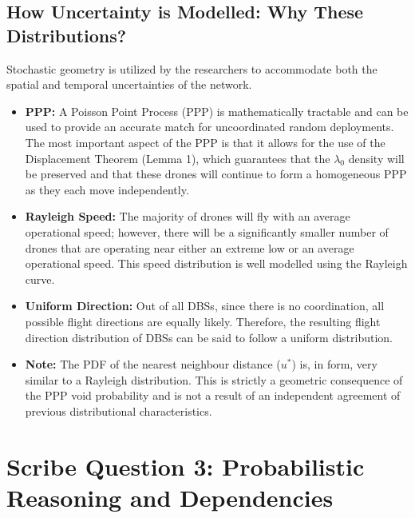 \documentclass[12pt,a4paper]{article}
\begin{document}
   \subsection*{How Uncertainty is Modelled: Why These Distributions?} %
Stochastic geometry is utilized by the researchers to accommodate both the spatial and temporal uncertainties of the network.    %
\begin{itemize}
    \item \textbf{PPP:} A Poisson Point Process (PPP) is mathematically tractable and can be used to provide an accurate match for uncoordinated random deployments.    %
    The most important aspect of the PPP is that it allows for the use of the Displacement Theorem (Lemma 1), which guarantees that the $\lambda_0$ density will be preserved and that these drones will continue to form a homogeneous PPP as they each move independently.    %
    \item \textbf{Rayleigh Speed:} The majority of drones will fly with an average operational speed; however, there will be a significantly smaller number of drones that are operating near either an extreme low or an average operational speed.    %
    This speed distribution is well modelled using the Rayleigh curve.    %
    \item \textbf{Uniform Direction:} Out of all DBSs, since there is no coordination, all possible flight directions are equally likely.    %
    Therefore, the resulting flight direction distribution of DBSs can be said to follow a uniform distribution.    %
    \item \textbf{Note:} The PDF of the nearest neighbour distance ($u^*$) is, in form, very similar to a Rayleigh distribution.    %
    This is strictly a geometric consequence of the PPP void probability and is not a result of an independent agreement of previous distributional characteristics.    %
\end{itemize}

\vspace{1em}
   \section*{Scribe Question 3: Probabilistic Reasoning and Dependencies} %
\end{document}
